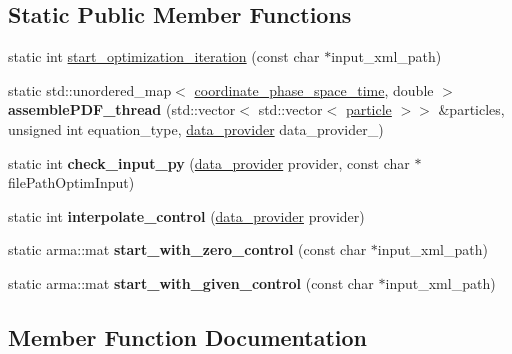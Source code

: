 \subsection*{Static Public Member Functions}
\begin{DoxyCompactItemize}
\item 
static int \hyperlink{classoptim__controller_abbf7841344a99ccd29fc38891763b43f}{start\+\_\+optimization\+\_\+iteration} (const char $\ast$input\+\_\+xml\+\_\+path)
\item 
\mbox{\label{classoptim__controller_a59a2704ba13f6d865de66c6df1838ef7}} 
static std\+::unordered\+\_\+map$<$ \hyperlink{classcoordinate__phase__space__time}{coordinate\+\_\+phase\+\_\+space\+\_\+time}, double $>$ {\bfseries assemble\+P\+D\+F\+\_\+thread} (std\+::vector$<$ std\+::vector$<$ \hyperlink{classparticle}{particle} $>$$>$ \&particles, unsigned int equation\+\_\+type, \hyperlink{classdata__provider}{data\+\_\+provider} data\+\_\+provider\+\_\+)
\item 
\mbox{\label{classoptim__controller_a0b0264fedf364aca6d7531fb54239f10}} 
static int {\bfseries check\+\_\+input\+\_\+py} (\hyperlink{classdata__provider}{data\+\_\+provider} provider, const char $\ast$file\+Path\+Optim\+Input)
\item 
\mbox{\label{classoptim__controller_af1012e1ce21abe7056d3a48ce1c58c1e}} 
static int {\bfseries interpolate\+\_\+control} (\hyperlink{classdata__provider}{data\+\_\+provider} provider)
\item 
\mbox{\label{classoptim__controller_a97a287ae5ad640cc535a5cb3c1daad7f}} 
static arma\+::mat {\bfseries start\+\_\+with\+\_\+zero\+\_\+control} (const char $\ast$input\+\_\+xml\+\_\+path)
\item 
\mbox{\label{classoptim__controller_a13e9d1f3242d17fb59bdb7c3f3cec85a}} 
static arma\+::mat {\bfseries start\+\_\+with\+\_\+given\+\_\+control} (const char $\ast$input\+\_\+xml\+\_\+path)
\end{DoxyCompactItemize}


\subsection{Member Function Documentation}
\mbox{\label{classoptim__controller_abbf7841344a99ccd29fc38891763b43f}} 
